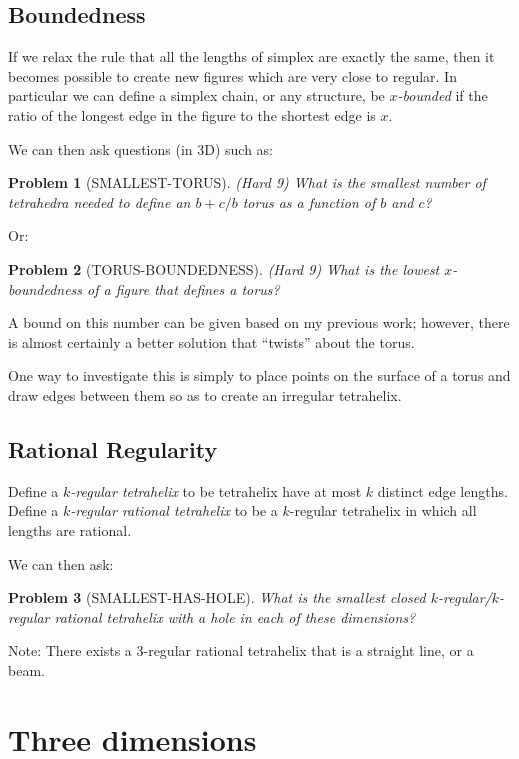 \documentclass[11pt]{article}
\newtheorem{problem}{Problem}
\begin{document}
\subsection{Boundedness}

If we relax the rule that all the lengths of simplex are exactly the same, then it becomes possible to create new figures which are
very close to regular. In particular we can define a simplex chain, or any structure, be {\em $x$-bounded} if the ratio of the longest edge
in the figure to the shortest edge is $x$.

We can then ask questions (in 3D) such as:

\begin{problem}[SMALLEST-TORUS]
(Hard 9)  What is the smallest number of tetrahedra needed to define an $b+c/b$ torus as a function of $b$ and $c$?
  \end{problem}

Or:

\begin{problem}[TORUS-BOUNDEDNESS]
(Hard 9)  What is the lowest $x$-boundedness of a figure that defines a torus?
  \end{problem}

A bound on this number can be given based on my previous work; however, there is almost certainly a better solution that ``twists'' about the torus.

One way to investigate this is simply to place points on the surface of a torus and draw edges between them so as to create an irregular tetrahelix.

\subsection{Rational Regularity}

Define a {\em $k$-regular tetrahelix} to be tetrahelix have at most $k$ distinct edge lengths.
Define a {\em $k$-regular rational tetrahelix} to be a $k$-regular tetrahelix in which all lengths are rational.

We can then ask:

\begin{problem}[SMALLEST-HAS-HOLE]
  What is the smallest closed $k$-regular/$k$-regular rational tetrahelix with a hole in each of these dimensions?
\end{problem}

Note: There exists a 3-regular rational tetrahelix that is a straight line, or a beam.


\section{Three dimensions}
\end{document}

